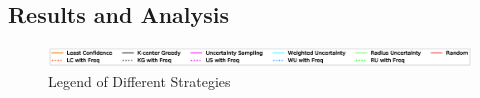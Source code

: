 
\subsection{Results and Analysis}
\label{sec:results}

\begin{figure}[th!]%
\begin{center}
\includegraphics[scale=0.55]{res/legend.eps}
\caption{Legend of Different Strategies}
\label{fig:legend}
\end{center}
\end{figure}

